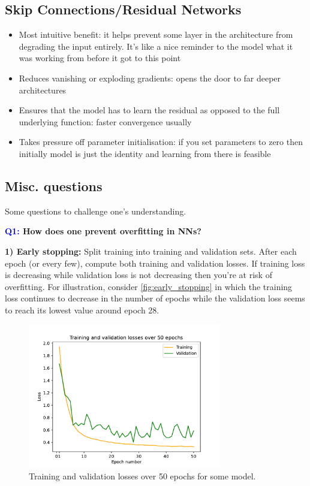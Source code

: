\documentclass[11pt]{article}
\begin{document}
\subsection{Skip Connections/Residual Networks}
\begin{itemize}
    \item Most intuitive benefit: it helps prevent some layer in the architecture from degrading the input entirely. It's like a nice reminder to the model what it was working from before it got to this point
    \item Reduces vanishing or exploding gradients: opens the door to far deeper architectures
    \item Ensures that the model has to learn the residual as opposed to the full underlying function: faster convergence usually
    \item Takes pressure off parameter initialisation: if you set parameters to zero then initially model is just the identity and learning from there is feasible
\end{itemize}

\subsection{Misc. questions}

Some questions to challenge one's understanding.

\begin{center}
    \textbf{\textcolor{blue}{Q1:} How does one prevent overfitting in NNs?}
\end{center}
\textbf{1) Early stopping:} Split training into training and validation sets. After each epoch (or every few), compute both training and validation losses. If training loss is decreasing while validation loss is not decreasing then you're at risk of overfitting. For illustration, consider \autoref{fig:early_stopping} in which the training loss continues to decrease in the number of epochs while the validation loss seems to reach its lowest value around epoch 28.

\begin{figure}
    \centering
    \includegraphics[width=0.75\textwidth]{./figures/neural_nets/REG_early_stopping.pdf}
    \caption{Training and validation losses over 50 epochs for some model.}
    \label{fig:early_stopping}
\end{figure}
\end{document}
